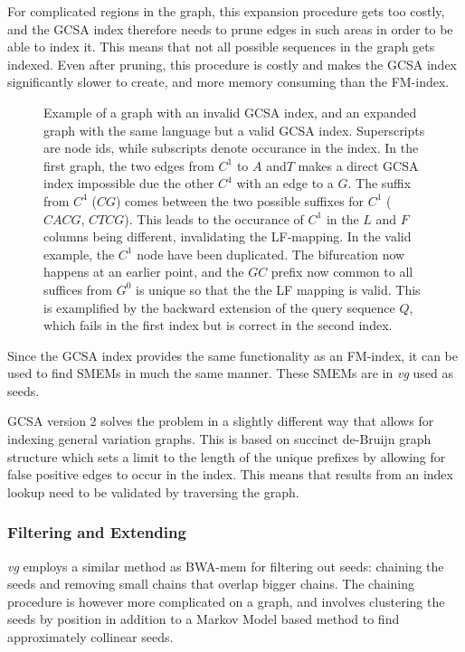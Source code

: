 For complicated regions in the graph, this expansion procedure gets too costly, and the GCSA index therefore needs to prune edges in such areas in order to be able to index it.
This means that not all possible sequences in the graph gets indexed. 
Even after pruning, this procedure is costly and makes the GCSA index significantly slower to create, and more memory consuming than the FM-index.

\begin{figure}
  \tikzpicture
  
  \endtikzpicture
  \caption{
    Example of a graph with an invalid GCSA index, and an expanded graph with the same language but a valid GCSA index. Superscripts are node ids, while subscripts denote occurance in the index. 
    In the first graph, the two edges from $C^1$ to $A$ and$T$ makes a direct GCSA index impossible due the other $C^4$ with an edge to a $G$. The suffix from $C^4$ ($CG$) comes between the two possible suffixes for $C^1$ ($CACG$, $CTCG$). This leads to the occurance of $C^1$ in the $L$ and $F$ columns being different, invalidating the LF-mapping.
    In the valid example, the $C^1$ node have been duplicated. The bifurcation now happens at an earlier point, and the $GC$ prefix now common to all suffices from $G^0$ is unique so that the the LF mapping is valid. This is examplified by the backward extension of the query sequence $Q$, which fails in the first index but is correct in the second index.
}
    \label{fig:gcsa}
\end{figure}

Since the GCSA index provides the same functionality as an FM-index, it can be used to find SMEMs in much the same manner. These SMEMs are in \emph{vg} used as seeds. 

GCSA version 2 solves the problem in a slightly different way that allows for indexing general variation graphs.
This is based on succinct de-Bruijn graph~\cite{succinctdebruijn} structure which sets a limit to the length of the unique prefixes by allowing for false positive edges to occur in the index.
This means that results from an index lookup need to be validated by traversing the graph. 

\subsubsection{Filtering and Extending}
\emph{vg} employs a similar method as BWA-mem for filtering out seeds: chaining the seeds and removing small chains that overlap bigger chains.
The chaining procedure is however more complicated on a graph, and involves clustering the seeds by position in addition to a Markov Model based method to find approximately collinear seeds. 


